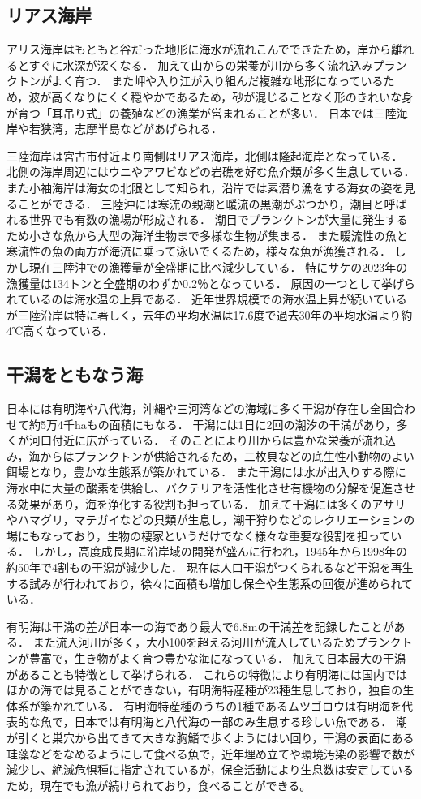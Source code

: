 \documentclass[12pt,a4j,titlepage]{ltjsarticle}
\begin{document}
\subsection{リアス海岸}
アリス海岸はもともと谷だった地形に海水が流れこんでできたため，岸から離れるとすぐに水深が深くなる．
加えて山からの栄養が川から多く流れ込みプランクトンがよく育つ．
また岬や入り江が入り組んだ複雑な地形になっているため，波が高くなりにくく穏やかであるため，砂が混じることなく形のきれいな身が育つ「耳吊り式」の養殖などの漁業が営まれることが多い．
日本では三陸海岸や若狭湾，志摩半島などがあげられる．\par
三陸海岸は宮古市付近より南側はリアス海岸，北側は隆起海岸となっている\cite{sanriku}．
北側の海岸周辺にはウニやアワビなどの岩礁を好む魚介類が多く生息している．
また小袖海岸は海女の北限として知られ，沿岸では素潜り漁をする海女の姿を見ることができる．
三陸沖には寒流の親潮と暖流の黒潮がぶつかり，潮目と呼ばれる世界でも有数の漁場が形成される．
潮目でプランクトンが大量に発生するため小さな魚から大型の海洋生物まで多様な生物が集まる．
また暖流性の魚と寒流性の魚の両方が海流に乗って泳いでくるため，様々な魚が漁獲される．
しかし現在三陸沖での漁獲量が全盛期に比べ減少している．
特にサケの2023年の漁獲量は134トンと全盛期のわずか0.2％となっている．
原因の一つとして挙げられているのは海水温の上昇である．
近年世界規模での海水温上昇が続いているが三陸沿岸は特に著しく，去年の平均水温は17.6度で過去30年の平均水温より約4℃高くなっている．
\subsection{干潟をともなう海}
日本には有明海や八代海，沖縄や三河湾などの海域に多く干潟が存在し全国合わせて約5万4千haもの面積にもなる\cite{higata}．
干潟には1日に2回の潮汐の干満があり，多くが河口付近に広がっている．
そのことにより川からは豊かな栄養が流れ込み，海からはプランクトンが供給されるため，二枚貝などの底生性小動物のよい餌場となり，豊かな生態系が築かれている．
また干潟には水が出入りする際に海水中に大量の酸素を供給し、バクテリアを活性化させ有機物の分解を促進させる効果があり，海を浄化する役割も担っている．
加えて干潟には多くのアサリやハマグリ，マテガイなどの貝類が生息し，潮干狩りなどのレクリエーションの場にもなっており，生物の棲家というだけでなく様々な重要な役割を担っている．
しかし，高度成長期に沿岸域の開発が盛んに行われ，1945年から1998年の約50年で4割もの干潟が減少した．
現在は人口干潟がつくられるなど干潟を再生する試みが行われており，徐々に面積も増加し保全や生態系の回復が進められている．\par
有明海は干満の差が日本一の海であり最大で6.8mの干満差を記録したことがある\cite{ariake}．
また流入河川が多く，大小100を超える河川が流入しているためプランクトンが豊富で，生き物がよく育つ豊かな海になっている．
加えて日本最大の干潟があることも特徴として挙げられる．
これらの特徴により有明海には国内ではほかの海では見ることができない，有明海特産種が23種生息しており，独自の生体系が築かれている．
有明海特産種のうちの1種であるムツゴロウは有明海を代表的な魚で，日本では有明海と八代海の一部のみ生息する珍しい魚である．
潮が引くと巣穴から出てきて大きな胸鰭で歩くようにはい回り，干潟の表面にある珪藻などをなめるようにして食べる魚で，近年埋め立てや環境汚染の影響で数が減少し、絶滅危惧種に指定されているが，保全活動により生息数は安定しているため，現在でも漁が続けられており，食べることができる。
\end{document}
